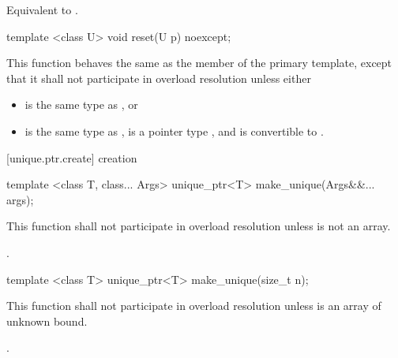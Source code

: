 \begin{itemdescr}
\pnum
\effects Equivalent to .
\end{itemdescr}

%
\begin{itemdecl}
template <class U> void reset(U p) noexcept;
\end{itemdecl}

\begin{itemdescr}
\pnum
This function behaves the same as
the  member of the primary template,
except that it shall not participate in overload resolution
unless either

\begin{itemize}
\item {} is the same type as , or
\item {} is the same type as ,
       is a pointer type , and
       is convertible to .
\end{itemize}
\end{itemdescr}

[unique.ptr.create]{ creation}

%
\begin{itemdecl}
template <class T, class... Args> unique_ptr<T> make_unique(Args&&... args);
\end{itemdecl}

\begin{itemdescr}
\pnum
\remarks This function shall not participate in overload resolution unless  is not an array.

\pnum
\returns {}.

\end{itemdescr}

%
\begin{itemdecl}
template <class T> unique_ptr<T> make_unique(size_t n);
\end{itemdecl}

\begin{itemdescr}
\pnum
\remarks This function shall not participate in overload resolution unless  is an array of unknown bound.

\pnum
\returns {}.

\end{itemdescr}

